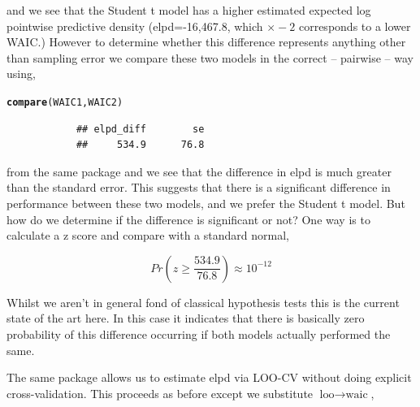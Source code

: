 \documentclass[11pt,fullpage]{book}
\makeatletter
\newenvironment{kframe}{%
	\def\at@end@of@kframe{}%
	\ifinner\ifhmode%
	\def\at@end@of@kframe{\end{minipage}}%
\begin{minipage}{\columnwidth}%
	\fi\fi%
	\def\FrameCommand##1{\hskip\@totalleftmargin \hskip-\fboxsep
		\colorbox{shadecolor}{##1}\hskip-\fboxsep
		\hskip-\linewidth \hskip-\@totalleftmargin \hskip\columnwidth}%
	\MakeFramed {\advance\hsize-\width
		\@totalleftmargin\z@ \linewidth\hsize
		\@setminipage}}%
{\par\unskip\endMakeFramed%
	\at@end@of@kframe}
\newcommand{\hlstd}[1]{\textcolor[rgb]{0.345,0.345,0.345}{#1}}%
\newcommand{\hlkwd}[1]{\textcolor[rgb]{0.737,0.353,0.396}{\textbf{#1}}}%
\newenvironment{knitrout}{}{} %
\makeatother
\begin{document}
and we see that the Student t model has a higher estimated expected log pointwise predictive density (elpd=-16,467.8, which $\times -2$ corresponds to a lower WAIC.) However to determine whether this difference represents anything other than sampling error we compare these two models in the correct -- pairwise -- way using,

\begin{knitrout}\small
		\color{fgcolor}\begin{kframe}
			\begin{alltt}
\hlkwd{compare}\hlstd{(WAIC1,WAIC2)}
			\end{alltt}
			\begin{verbatim}
			## elpd_diff        se 
			##     534.9      76.8
			\end{verbatim}
		\end{kframe}
	\end{knitrout}

from the same package and we see that the difference in elpd is much greater than the standard error. This suggests that there is a significant difference in performance between these two models, and we prefer the Student t model. But how do we determine if the difference is significant or not? One way is to calculate a z score and compare with a standard normal,

\begin{equation}
Pr(z\geq \frac{534.9}{76.8}) \approx 10^{-12}
\end{equation}

Whilst we aren't in general fond of classical hypothesis tests this is the current state of the art here. In this case it indicates that there is basically zero probability of this difference occurring if both models actually performed the same. 

The same package allows us to estimate elpd via LOO-CV without doing explicit cross-validation. This proceeds as before except we substitute $\text{loo}\rightarrow\text{waic}$,
\end{document}
